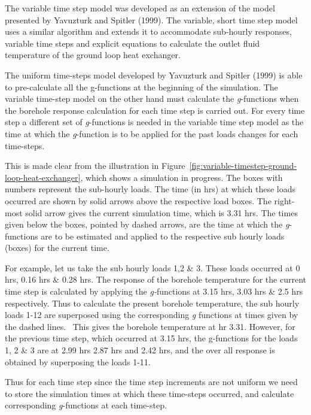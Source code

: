 The variable time step model was developed as an extension of the model presented by Yavuzturk and Spitler (1999). The variable, short time step model uses a similar algorithm and extends it to accommodate sub-hourly responses, variable time steps and explicit equations to calculate the outlet fluid temperature of the ground loop heat exchanger.

The uniform time-steps model developed by Yavuzturk and Spitler (1999) is able to pre-calculate all the g-functions at the beginning of the simulation. The variable time-step model on the other hand must calculate the \emph{g}-functions when the borehole response calculation for each time step is carried out. For every time step a different set of \emph{g}-functions is needed in the variable time step model as the time at which the \emph{g}-function is to be applied for the past loads changes for each time-steps.

This is made clear from the illustration in Figure~\ref{fig:variable-timestep-ground-loop-heat-exchanger}, which shows a simulation in progress. The boxes with numbers represent the sub-hourly loads. The time (in hrs) at which these loads occurred are shown by solid arrows above the respective load boxes. The right-most solid arrow gives the current simulation time, which is 3.31 hrs. The times given below the boxes, pointed by dashed arrows, are the time at which the \emph{g}-functions are to be estimated and applied to the respective sub hourly loads (boxes) for the current time.

For example, let us take the sub hourly loads 1,2 \& 3. These loads occurred at 0 hrs, 0.16 hrs \& 0.28 hrs. The response of the borehole temperature for the current time step is calculated by applying the \emph{g­-}functions at 3.15 hrs, 3.03 hrs \& 2.5 hrs respectively. Thus to calculate the present borehole temperature, the sub hourly loads 1-12 are superposed using the corresponding \emph{g} functions at times given by the dashed lines.~ This gives the borehole temperature at hr 3.31. However, for the previous time step, which occurred at 3.15 hrs, the g-functions for the loads 1, 2 \& 3 are at 2.99 hrs 2.87 hrs and 2.42 hrs, and the over all response is obtained by superposing the loads 1-11.

Thus for each time step since the time step increments are not uniform we need to store the simulation times at which these time-steps occurred, and calculate corresponding \emph{g}-functions at each time-step.

